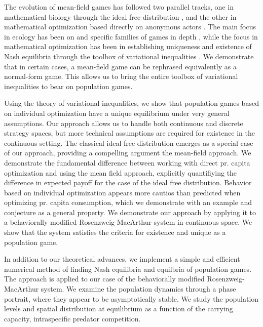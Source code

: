 The evolution of mean-field games has followed two parallel tracks, one in mathematical biology through the ideal free distribution \citep{fretwell1969territorial, cressman2004ideal, kvrivan2008ideal, cressman2010ideal, broom2013game, parker1978searching}, and the other in mathematical optimization based directly on anonymous actors \citep{lasry2007mean, aumann1964markets, blanchet2016optimal}. The main focus in ecology has been on and specific families of games in depth \cite{broom2013game}, while the focus in mathematical optimization has been in establishing uniqueness and existence of Nash equilibria through the toolbox of variational inequalities \citep{karamardian1969nonlinear, gabay1980uniqueness, nabetani2011parametrized}. We demonstrate that in certain cases, a mean-field game can be rephrased equivalently as a normal-form game. This allows us to bring the entire toolbox of variational inequalities to bear on population games.


Using the theory of variational inequalities, we show that population games based on individual optimization have a unique equilibrium under very general assumptions. Our approach allows us to handle both continuous and discrete strategy spaces, but more technical assumptions are required for existence in the continuous setting. The classical ideal free distribution emerges as a special case of our approach, providing a compelling argument the mean-field approach. We demonstrate the fundamental difference between working with direct pr. capita optimization and using the mean field approach, explicitly quantifiying the difference in expected payoff for the case of the ideal free distribution. Behavior based on individual optimization appears more cautios than predicted when optimizing pr. capita consumption, which we demonstrate with an example and conjecture as a general property. We demonstrate our approach by applying it to a behaviorally modified Rosenzweig-MacArthur system in continuous space. We show that the system satisfies the criteria for existence and unique as a population game.


In addition to our theoretical advances, we implement a simple and efficient numerical method of finding Nash equilibria and equilbria of population games. The approach is applied to our case of the behaviorally modified Rosenzweig-MacArthur system. We examine the population dynamics through a phase portrait, where they appear to be asymptotically stable. We study the population levels and spatial distribution at equilibrium as a function of the carrying capacity, intraspecific predator competition.

